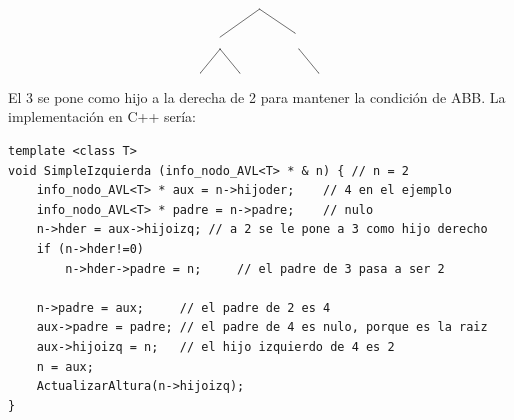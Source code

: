 \documentclass[10pt,a4paper,spanish]{report}
\begin{document}
\begin{description}
\[\begin{xy}
	\ar@{-} (0,-2);(-10,-9) %
	\ar@{-} (0,-2);(9,-8) %
	\ar@{-} (-10,-12);(-15,-18) %
	\ar@{-} (10,-12);(15,-18) %
	\ar@{-} (-10,-12);(-5,-18) %
	\end{xy}\]

	\noindent
	El 3 se pone como hijo a la derecha de 2 para mantener la condición de ABB. La implementación en C++ sería:

\begin{verbatim}
template <class T>
void SimpleIzquierda (info_nodo_AVL<T> * & n) { // n = 2
	info_nodo_AVL<T> * aux = n->hijoder;	// 4 en el ejemplo
	info_nodo_AVL<T> * padre = n->padre;	// nulo
	n->hder = aux->hijoizq; // a 2 se le pone a 3 como hijo derecho
	if (n->hder!=0)
		n->hder->padre = n;		// el padre de 3 pasa a ser 2

	n->padre = aux;		// el padre de 2 es 4
	aux->padre = padre;	// el padre de 4 es nulo, porque es la raiz
	aux->hijoizq = n;	// el hijo izquierdo de 4 es 2
	n = aux;
	ActualizarAltura(n->hijoizq);
}
\end{verbatim}
\end{description}
\end{document}
